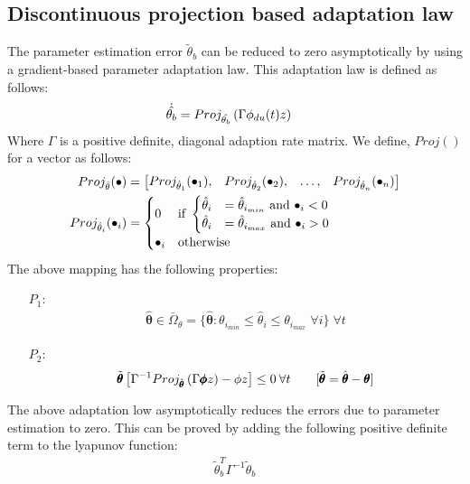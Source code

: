\subsection{Discontinuous projection based adaptation law}
The parameter estimation error $\tilde \theta_b$ can be reduced to zero asymptotically by using a gradient-based parameter adaptation law. This adaptation law is defined as follows:
\begin{align}
    \dot{\hat{\theta_b}} &= Proj_{\hat{\theta_b}}\left( \Gamma \phi_{du}(t) z \right)
\end{align}
Where $\Gamma$ is a positive definite, diagonal adaption rate matrix.
We define,  $Proj()$ for a vector as follows:
\begin{align}
    Proj_{\hat{\theta}} (\bullet) &= \begin{bmatrix} Proj_{\hat \theta_1}(\bullet_1), &
                                        Proj_{\hat \theta_2}(\bullet_2), &
                                        \hdots, &
                                        Proj_{\hat \theta_n}(\bullet_n) \end{bmatrix}\\
    Proj_{\hat \theta_i}(\bullet_i)
    &= \begin{cases}
        0 & \text{if } \begin{cases}
                        \hat \theta_i &= \hat \theta_{i_{min}} \text{  and  } \bullet_i < 0\\
                        \hat \theta_i &= \hat \theta_{i_{max}} \text{  and  } \bullet_i > 0\\
                       \end{cases}\\
        \bullet_i & \text{otherwise}
    \end{cases}
\end{align}
The above mapping has the following properties:
\begin{itemize}
    \item[$P_1$:]
    \begin{align}
        \hat{\pmb \theta} \in \bar \Omega_{\theta}=\{\hat{\pmb \theta} :
        \theta_{i_{min}} \leq \hat \theta_i \leq \theta_{i_{max}} \; \forall
        i\} \; \forall t
    \end{align}

    \item[$P_2$:]
    \begin{align}
        \tilde{\pmb{\theta}} \left[ \Gamma^{-1} Proj_{\hat{\pmb\theta}}
        \left( \Gamma \pmb \phi z \right) - \phi z \right] \leq 0 \: \forall t \qquad
        [\tilde{\pmb{\theta}} = \hat{\pmb\theta} - \pmb \theta]
    \end{align}
\end{itemize}

The above adaptation low asymptotically reduces the errors due to parameter
estimation to zero. This can be proved by adding the following positive
definite term to the lyapunov function:
\begin{align*}
    \tilde \theta_b^T \Gamma^{-1} \tilde \theta_b
\end{align*}
